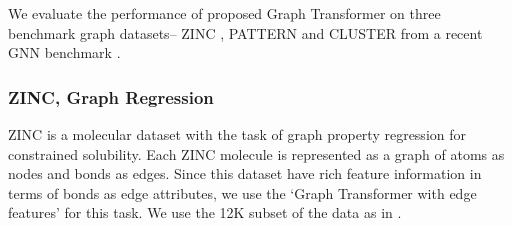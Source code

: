 \documentclass[letterpaper]{article} %
\begin{document}
\begin{table}[t!]
    \centering
    \caption{
    Comparison of our best performing scores (from Table \ref{tab:results}) on each dataset against the GNN baselines (GCN \cite{kipf2017semi}, GAT \cite{velickovic2018graph}, GatedGCN\cite{bresson2017residual}) 
    of 500k model parameters. 
    \textbf{Note:} Only GatedGCN and GT models use the available edge attributes in ZINC.
    }
    \label{tab:results_comparison}
\end{table}

We evaluate the performance of proposed Graph Transformer on three benchmark graph datasets-- ZINC \cite{irwin2012zinc}, PATTERN and CLUSTER \cite{abbe2017community} from a recent GNN benchmark \cite{dwivedi2020benchmarking}. 

\subsubsection{ZINC, Graph Regression}
ZINC \cite{irwin2012zinc} is a molecular dataset with the task of graph property regression for constrained solubility. Each ZINC molecule is represented as a graph of atoms as nodes and bonds as edges. Since this dataset have rich feature information in terms of bonds as edge attributes, we use the `Graph Transformer with edge features' for this task. We use the 12K subset of the data as in \citet{dwivedi2020benchmarking}.
\end{document}
